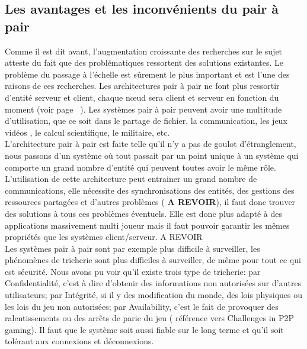 	\subsection{Les avantages et les inconvénients du pair à pair}
	Comme il est dit avant, l'augmentation croissante des recherches sur le sujet atteste du fait que des problématiques ressortent des solutions existantes. Le problème du passage à l'échelle est sûrement le plus important et est l'une des raisons de ces recherches. Les architectures pair à pair ne font plus ressortir d'entité serveur et client, chaque nœud sera client et serveur en fonction du moment (voir page ~\pageref{P2P/ClServ}). Les systèmes pair à pair peuvent avoir une multitude d'utilisation, que ce soit dans le partage de fichier, la communication, les jeux vidéos , le calcul scientifique, le militaire, etc. \\
	L'architecture pair à pair est faite telle qu'il n'y a pas de goulot d'étranglement, nous passons d'un système où tout passait par un point unique à un système qui comporte un grand nombre d'entité qui peuvent toutes avoir le même rôle. L'utilisation de cette architecture peut entrainer un grand nombre de communications, elle nécessite des synchronisations des entités, des gestions des ressources partagées et d'autres problèmes ( \textbf{A REVOIR}), il faut donc trouver des solutions à tous ces problèmes éventuels. Elle est donc plus adapté à des applications massivement multi joueur mais il faut pouvoir garantir les mêmes propriétés que les systèmes client/serveur. A REVOIR\\
	Les systèmes pair à pair sont par exemple plus difficile à surveiller, les phénomènes de tricherie sont plus difficiles à surveiller, de même pour tout ce qui est sécurité. Nous avons pu voir qu'il existe trois type de tricherie: par Confidentialité, c'est à dire d'obtenir des informations non autorisées sur d'autres utilisateurs; par Intégrité, si il y des modification du monde, des lois physiques ou les lois du jeu non autorisées; par Availability, c'est le fait de provoquer des ralentissements ou des arrêts de parie du jeu ( référence vers Challenges in P2P gaming). Il faut que le système soit aussi fiable sur le long terme et qu'il soit tolérant aux connexions et déconnexions.\\
	
